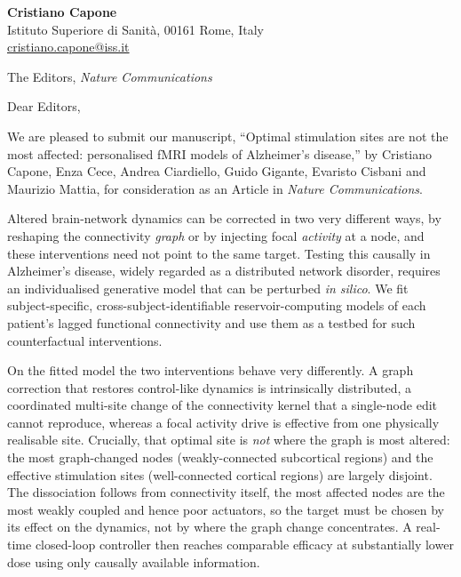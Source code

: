\documentclass[11pt]{article}
\begin{document}
{\raggedright
\textbf{Cristiano Capone}\\
Istituto Superiore di Sanit\`a, 00161 Rome, Italy\\
\href{mailto:cristiano.capone@iss.it}{cristiano.capone@iss.it}\par}

\vspace{0.6em}
{\raggedright The Editors, \textit{Nature Communications}\par}

\vspace{0.8em}

Dear Editors,

We are pleased to submit our manuscript, ``Optimal stimulation sites are not the
most affected: personalised fMRI models of Alzheimer's disease,'' by Cristiano
Capone, Enza Cece, Andrea Ciardiello, Guido Gigante,
Evaristo Cisbani and Maurizio Mattia, for consideration as an Article in
\textit{Nature Communications}.

Altered brain-network dynamics can be corrected in two very different ways, by
reshaping the connectivity \emph{graph} or by injecting focal \emph{activity} at a
node, and these interventions need not point to the same target. Testing this
causally in Alzheimer's disease, widely regarded as a distributed network
disorder, requires an individualised generative model that can be perturbed
\emph{in silico}. We fit subject-specific, cross-subject-identifiable
reservoir-computing models of each patient's lagged functional connectivity and
use them as a testbed for such counterfactual interventions.

On the fitted model the two interventions behave very differently. A graph
correction that restores control-like dynamics is intrinsically distributed, a
coordinated multi-site change of the connectivity kernel that a single-node edit
cannot reproduce, whereas a focal activity drive is effective from one physically
realisable site. Crucially, that optimal site is \emph{not} where the graph is
most altered: the most graph-changed nodes (weakly-connected subcortical regions)
and the effective stimulation sites (well-connected cortical regions) are largely
disjoint. The dissociation follows from connectivity itself, the most affected
nodes are the most weakly coupled and hence poor actuators, so the target must be
chosen by its effect on the dynamics, not by where the graph change concentrates.
A real-time closed-loop controller then reaches comparable efficacy at
substantially lower dose using only causally available information.
\end{document}
